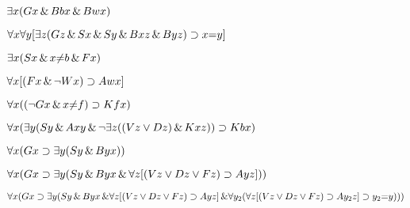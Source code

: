 \begin{earg}
\item $\exists x (Gx \,\&\, Bbx \,\&\, Bwx)$ %
\item $\forall x \forall y [\exists z (Gz \,\&\, Sx \,\&\, Sy \,\&\, Bxz \,\&\, Byz) \supset x{=}y]$ %
\item $\exists x (Sx \,\&\, x{\neq}b \,\&\, Fx)$ %
\item $\forall x [(Fx \,\&\, \neg Wx) \supset Awx]$ %
\item $\forall x ((\neg Gx \,\&\, x{\neq}f) \supset Kfx)$ %
\item $\forall x (\exists y (Sy \,\&\, Axy \,\&\, \neg \exists z ((Vz \vee Dz) \,\&\, Kxz)) \supset Kbx)$ %
\item $\forall x (Gx \supset \exists y (Sy \,\&\, Byx))$ %
\item $\forall x (Gx \supset \exists y (Sy \,\&\, Byx \,\&\, \forall z [(Vz \vee Dz \vee Fz) \supset Ayz]))$ %
\item $\forall x (Gx \supset \exists y (Sy \,\&\, Byx \,\&\, \\ 
\forall z [(Vz \vee Dz \vee Fz) \supset Ayz] \,\&\, \\ 
	\forall y_{2} (\forall z [(Vz \vee Dz \vee Fz) \supset Ay_{2}z] \supset y_{2}{=}y) ))$ %
\end{earg}


